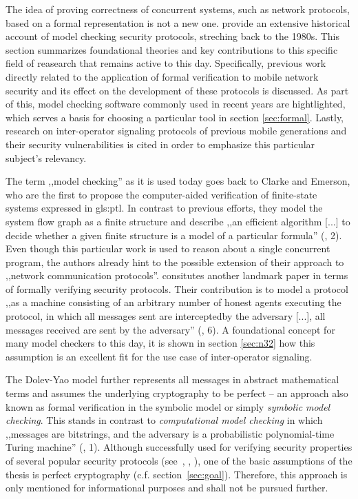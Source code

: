 The idea of proving correctness of concurrent systems, such as network protocols, based on a formal representation is not a new one.
\cite{basin2018model} provide an extensive historical account of model checking security protocols, streching back to the 1980s.
This section summarizes foundational theories and key contributions to this specific field of reasearch that remains active to this day.
Specifically, previous work directly related to the application of formal verification to mobile network security and its effect on the development of these protocols is discussed.
As part of this, model checking software commonly used in recent years are hightlighted, which serves a basis for choosing a particular tool in section \ref{sec:formal}.
Lastly, research on inter-operator signaling protocols of previous mobile generations and their security vulnerabilities is cited in order to emphasize this particular subject's relevancy.

The term ,,model checking'' as it is used today goes back to Clarke and Emerson, who are the first to propose the computer-aided verification of finite-state systems expressed in \gls{gls:ptl}.
In contrast to previous efforts, they model the system flow graph as a finite structure and describe ,,an efficient algorithm [...] to decide whether a given finite structure is a model of a particular formula'' (\cite{clarke1981design}, 2).
Even though this particular work is used to reason about a single concurrent program, the authors already hint to the possible extension of their approach to ,,network communication protocols''.
\cite{dolev1983security} consitutes another landmark paper in terms of formally verifying security protocols.
Their contribution is to model a protocol ,,as a machine consisting of an arbitrary number of honest agents executing the protocol, in which all messages sent are interceptedby the adversary [...], all messages received are sent by the adversary'' (\cite{basin2018model}, 6).
A foundational concept for many model checkers to this day, it is shown in section \ref{sec:n32} how this assumption is an excellent fit for the use case of inter-operator signaling.

The Dolev-Yao model further represents all messages in abstract mathematical terms and assumes the underlying cryptography to be perfect -- an approach also known as formal verification in the symbolic model or simply \textit{symbolic model checking}.
This stands in contrast to \textit{computational model checking} in which ,,messages are bitstrings, and the adversary is a probabilistic polynomial-time Turing machine'' (\cite{blanchet2008computationally}, 1).
Although successfully used for verifying security properties of several popular security protocols (see~\cite{BlanchetJaggardScedrovTsayAsiaCCS08}, \cite{CadeBlanchetJoWUA13}, \cite{LippBlanchetBhargavanEuroSP19}), one of the basic assumptions of the thesis is perfect cryptography (c.f. section~\ref{sec:goal}).
Therefore, this approach is only mentioned for informational purposes and shall not be pursued further.

